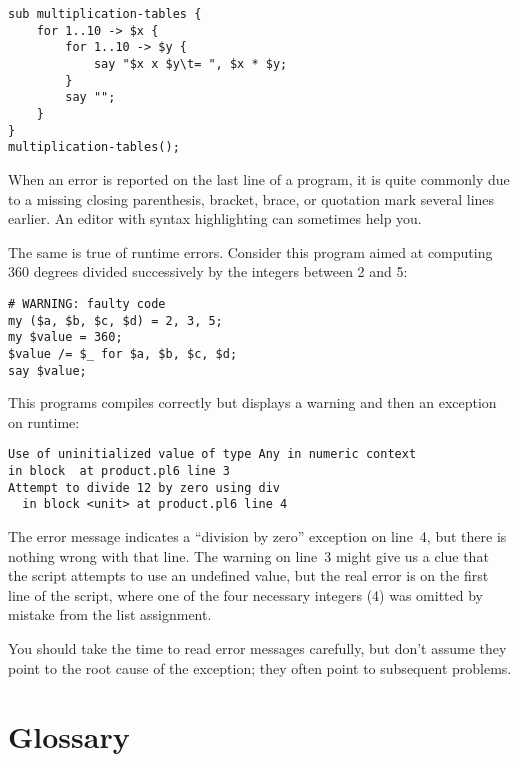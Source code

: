 \begin{verbatim}
sub multiplication-tables {
    for 1..10 -> $x {
        for 1..10 -> $y {
            say "$x x $y\t= ", $x * $y;
        }
        say "";
    }
}
multiplication-tables();
\end{verbatim}

When an error is reported on the last line of a program, 
it is quite commonly due to a missing closing parenthesis, 
bracket, brace, or quotation mark several lines earlier. 
An editor with syntax highlighting can sometimes help you.


The same is true of runtime errors. Consider this program 
aimed at computing 360 degrees divided successively by 
the integers between 2 and 5:

\begin{verbatim}
# WARNING: faulty code
my ($a, $b, $c, $d) = 2, 3, 5;
my $value = 360;
$value /= $_ for $a, $b, $c, $d;
say $value;
\end{verbatim}

This programs compiles correctly but displays a warning and 
then an exception on runtime:

\begin{verbatim}
Use of uninitialized value of type Any in numeric context 
in block  at product.pl6 line 3
Attempt to divide 12 by zero using div
  in block <unit> at product.pl6 line 4
\end{verbatim}
%

The error message indicates a ``division by zero'' exception 
on line~4, but there is nothing wrong with that line. 
The warning on line~3 might give us a clue that the 
script attempts to use an undefined value, but the real error 
is on the first line of the script, where one of the four 
necessary integers (4) was omitted by mistake from the list 
assignment.


You should take the time to read error messages carefully, 
but don't assume they point to the root cause of the 
exception; they often point to subsequent problems.


\section{Glossary}


